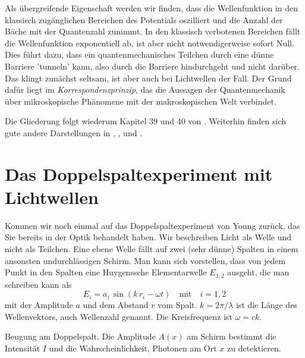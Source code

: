 Als übergreifende Eigenschaft werden wir finden, dass die Wellenfunktion in den klassisch zugänglichen Bereichen des Potentials oszilliert und die Anzahl der Bäche mit der Quantenzahl zunimmt. In den klassisch verbotenen Bereichen fällt die Wellenfunktion exponentiell ab, ist aber nicht notwendigerweise sofort Null. Dies führt dazu, dass ein quantenmechanisches Teilchen durch eine dünne Barriere 'tunneln' kann, also durch die Barriere hindurchgeht und nicht darüber. Das klingt zunächst seltsam, ist aber auch bei Lichtwellen der Fall. Der Grund dafür liegt im \emph{Korrespondenzprinzip}, das die Aussagen der Quantenmechanik über mikroskopische Phänomene mit der makroskopischen Welt verbindet.

Die Gliederung folgt wiederum  Kapitel 39 und 40 von \cite{Knight_physics}. Weiterhin finden sich gute andere Darstellungen in \cite{Haliday_Resnick}, \cite{Demtröder_ep3}, \cite{Haken_wolf_I} und \cite{Harris_moderne_Physik}.





\section{Das Doppelspaltexperiment mit Lichtwellen}

Kommen wir noch einmal auf das Doppelspaltexperiment von Young zurück, das Sie bereits in der Optik behandelt haben. Wir beschreiben Licht als Welle und nicht als Teilchen. Eine ebene Welle fällt auf zwei (sehr dünne) Spalten in einem ansonsten undurchlässigen Schirm. Man kann sich vorstellen, dass von jedem Punkt in den Spalten eine Huygenssche Elementarwelle $E_{1,2}$ ausgeht, die man schreiben kann als 
\begin{equation}
    E_{i} = a_i \, \sin ( k \, r_i - \omega t) \quad \text{mit} \quad i = 1,2
\end{equation}
mit der Amplitude $a$ und dem Abstand $r$ vom Spalt. $k = 2 \pi / \lambda $ ist die Länge des Wellenvektors, auch Wellenzahl genannt.
Die Kreisfrequenz ist $\omega = c k$.


\begin{marginfigure}
    \caption{Beugung am Doppelspalt. Die Amplitude $A(x)$ am Schirm bestimmt die Intensität $I$ und die Wahrscheinlichkeit, Photonen am Ort $x$ zu detektieren.}
    \label{fig:3_Doppelspalt}
\end{marginfigure}


